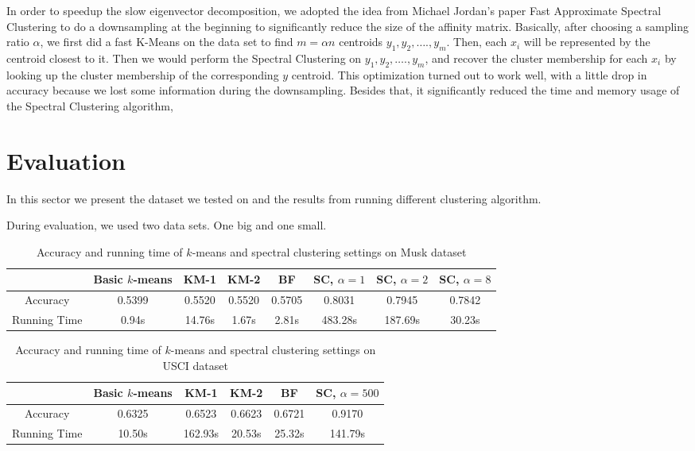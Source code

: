 \documentclass{acm_proc_article-sp}
\begin{document}
In order to speedup the slow eigenvector decomposition, we adopted the idea from Michael Jordan's paper Fast Approximate Spectral Clustering \cite{yan2009fast} to do a downsampling at the beginning to significantly reduce the size of the affinity matrix. Basically, after choosing a sampling ratio $\alpha$, we first did a fast K-Means on the data set to find $m = \alpha n$ centroids $y_1, y_2, …., y_m$. Then, each $x_i$ will be represented by the centroid closest to it. Then we would perform the Spectral Clustering on $y_1, y_2, …., y_m$, and recover the cluster membership for each $x_i$ by looking up the cluster membership of the corresponding $y$ centroid. This optimization turned out to work well, with a little drop in accuracy because we lost some information during the downsampling. Besides that, it significantly reduced the time and memory usage of the Spectral Clustering algorithm,


\section{Evaluation}


In this sector we present the dataset we tested on and the results from running different clustering algorithm.

During evaluation, we used two data sets. One big and one small.
\\

\begin{table*}
\centering
\begin{tabular}{|c|ccccccc|}
\hline
 & Basic $k$-means & KM-1 & KM-2 & BF & SC, $\alpha=1$ & SC, $\alpha=2$ & SC, $\alpha=8$ \\
 \hline
 Accuracy & 0.5399 & 0.5520 & 0.5520 & 0.5705 & 0.8031 & 0.7945 & 0.7842 \\
 Running Time & 0.94s & 14.76s & 1.67s & 2.81s & 483.28s & 187.69s & 30.23s\\
 \hline
\end{tabular}
\caption{Accuracy and running time of $k$-means and spectral clustering settings on Musk dataset}
\label{table_musk}
\end{table*}

\begin{table*}
\centering
\begin{tabular}{|c|ccccc|}
\hline
 & Basic $k$-means & KM-1 & KM-2 & BF & SC, $\alpha=500$ \\
 \hline
 Accuracy & 0.6325 & 0.6523 & 0.6623 & 0.6721 & 0.9170 \\
 Running Time & 10.50s & 162.93s & 20.53s & 25.32s & 141.79s\\
 \hline
\end{tabular}
\caption{Accuracy and running time of $k$-means and spectral clustering settings on USCI dataset}
\label{table_usci}
\end{table*}
\end{document}

